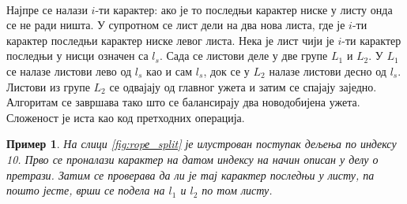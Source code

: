 \documentclass[12pt,oneside]{memoir}
\newtheorem{exmp}{Пример}
\begin{document}
\paragraph{}
Најпре се налази \(i\)-ти карактер: ако је то последњи карактер ниске у листу онда се не ради ништа. У супротном се лист дели на два нова листа, где је \(i\)-ти карактер последњи
карактер ниске левог листа. Нека је лист чији је \(i\)-ти карактер последњи у нисци
означен са \(l_s\). Сада се листови деле у две групе \(L_1\) и \(L_2\). У \(L_1\) се налазе
листови лево од \(l_s\) као и сам \(l_s\), док се у \(L_2\) налазе листови десно од \(l_s\). Листови из групе \(L_2\) се одвајају од главног ужета и затим се спајају заједно.
Алгоритам се завршава тако што се балансирају два новодобијена ужета. Сложеност је иста као
код претходних операција. 


\begin{exmp}
На слици \ref{fig:ropе_split} је 
илустрован поступак дељења по индексу 10. Прво се проналази карактер на датом индексу на
начин описан у делу о претрази. Затим се проверава да ли је тај карактер последњи у листу,
па пошто јесте, врши се подела на \(l_1\) и \(l_2\) по том листу.


\end{exmp}
\end{document}
